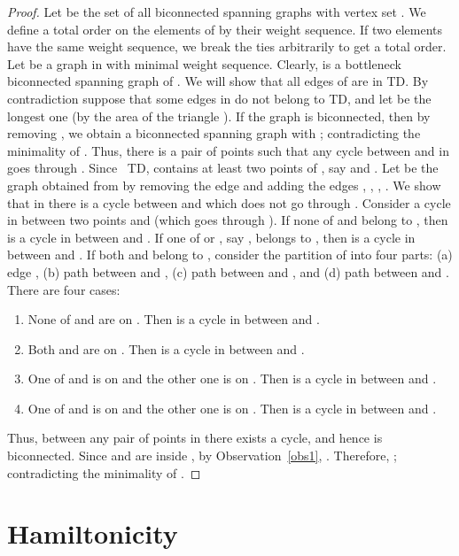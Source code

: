 \documentclass[11pt,a4paper]{article}
\newcommand{\kTD}[2]{\text{-}TD#2}
\begin{document}
\begin{proof}                                                                                       
Let  be the set of all biconnected spanning graphs with vertex set . We define a total order on the elements of  by their weight sequence. If two elements have the same weight sequence, we break the ties arbitrarily to get a total order.
Let  be a graph in  with minimal weight sequence. Clearly,  is a bottleneck biconnected spanning graph of . We will show that all edges of  are in \kTD{1}{}. By contradiction suppose that some edges in  do not belong to \kTD{1}{}, and let  be the longest one (by the area of the triangle ). If the graph  is biconnected, then by removing , we obtain a biconnected spanning graph  with ; contradicting the minimality of . Thus, there is a pair  of points such that any cycle between  and  in  goes through . Since ~\kTD{1}{},  contains at least two points of , say  and . Let  be the graph obtained from  by removing the edge  and adding the edges , , , . We show that in  there is a cycle between  and  which does not go through . Consider a cycle  in  between two points  and  (which goes through ). If none of  and  belong to , then  is a cycle in  between  and . If one of  or , say , belongs to , then  is a cycle in  between  and . If both  and  belong to , consider the partition of  into four parts: (a) edge , (b) path  between  and , (c) path  between  and , and (d) path  between  and . 
There are four cases:
\begin{enumerate}
 \item None of  and  are on . Then  is a cycle in  between  and .
 \item Both  and  are on . Then  is a cycle in  between  and .
 \item One of  and  is on  and the other one is on . Then  is a cycle in  between  and .
 \item One of  and  is on  and the other one is on . Then  is a cycle in  between  and .
\end{enumerate}

Thus, between any pair of points in  there exists a cycle, and hence  is biconnected. Since  and  are inside , by Observation~\ref{obs1}, . Therefore, ; contradicting the minimality of .   
\end{proof}


\section{Hamiltonicity}
\label{Hamiltonicity}
\end{document}
